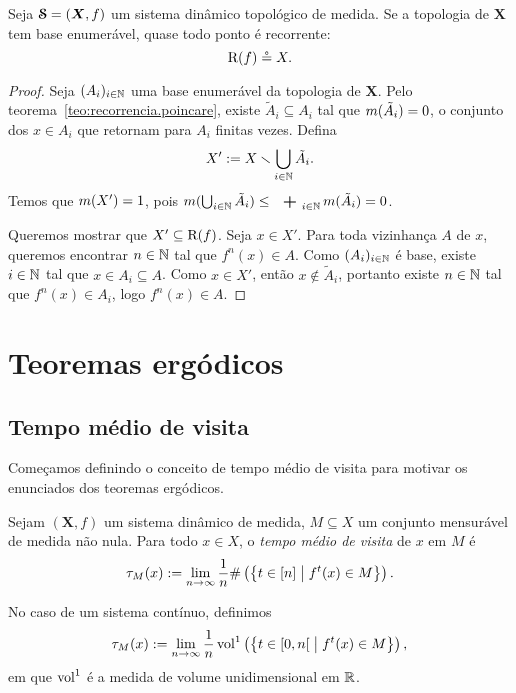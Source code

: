 \begin{theorem}
\label{teo:sd.top.poincare}
Seja $\bm{\mathcal{S}}=(\bm X,f)$ um sistema dinâmico topológico de medida. Se a topologia de $\bm X$ tem base enumerável, quase todo ponto é recorrente:
	\begin{equation*}
	\mathrm{R}(f) \circeq X.
	\end{equation*}
\end{theorem}
\begin{proof}
Seja $(A_i)_{i \in \mathbb{N}}$ uma base enumerável da topologia de $\bm X$. Pelo teorema~\ref{teo:recorrencia.poincare}, existe $\tilde A_i \subseteq A_i$ tal que $m(\tilde A_i) = 0$, o conjunto dos $x \in A_i$ que retornam para $A_i$ finitas vezes. Defina
	\begin{equation*}
	X' := X \smallsetminus \bigcup_{i \in \mathbb{N}} \tilde A_i.
	\end{equation*}
Temos que $m(X') = 1$, pois $\med(\bigcup_{i \in \N} \tilde A_i) \leq \sum_{i \in \N} \med(\tilde A_i) = 0$.

Queremos mostrar que $X' \subseteq \mathrm{R}(f)$. Seja $x \in X'$. Para toda vizinhança $A$ de $x$, queremos encontrar $n \in \mathbb{N}$ tal que $f^n(x) \in A$. Como $(A_i)_{i \in \mathbb{N}}$ é base, existe $i \in \mathbb{N}$ tal que $x \in A_i \subseteq A$. Como $x \in X'$, então $x \notin \tilde A_i$, portanto existe $n \in \mathbb{N}$ tal que $f^n(x) \in A_i$, logo $f^n(x) \in A$.
\end{proof}





\section{Teoremas ergódicos}

\subsection{Tempo médio de visita}

Começamos definindo o conceito de tempo médio de visita para motivar os enunciados dos teoremas ergódicos.

\begin{definition}
Sejam $(\bm X,f)$ um sistema dinâmico de medida, $M \subseteq X$ um conjunto mensurável de medida não nula. Para todo $x \in X$, o \emph{tempo médio de visita} de $x$ em $M$ é
	\begin{equation*}
	\tau_M(x) := \lim_{n \to \infty} \frac{1}{n} \#\left(\left\{{t \in [n]}\;\middle\vert\;{f^t(x) \in M}\right\}\right).
	\end{equation*}

No caso de um sistema contínuo, definimos
	\begin{equation*}
	\tau_M(x) := \lim_{n \to \infty} \frac{1}{n} \operatorname{vol}^1\left(\left\{{t \in \left[{0},{n}\right[}\;\middle\vert\;{f^t(x) \in M}\right\}\right),
	\end{equation*}
em que $\operatorname{vol}^1$ é a medida de volume unidimensional em $\mathbb{R}$.
\end{definition}

